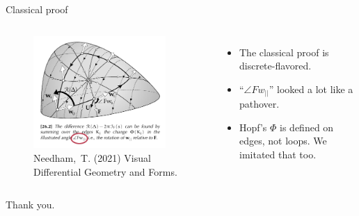\documentclass[14pt,aspectratio=169]{beamer}
\begin{document}
\begin{frame}{Classical proof}
\begin{columns}
\vspace{12pt}
\begin{figure}
\includegraphics[width=0.9\textwidth]{figs/needham_triangle_circ.pdf}
\caption{{Needham,~T. (2021) Visual Differential Geometry and Forms.}}
\end{figure}
\vspace{-12pt}
\begin{itemize}
\item The classical proof is discrete-flavored.
\item ``\( \angle Fw_{||} \)'' looked a lot like a pathover.
\item Hopf's \( \Phi \) is defined on edges, not loops. We imitated that too.
\end{itemize}
\end{columns}
\end{frame}

\begin{frame}
Thank you.
\end{frame}
\end{document}
